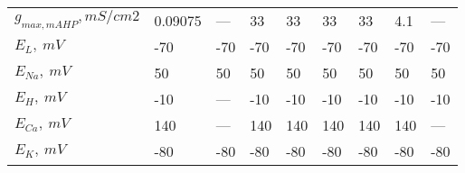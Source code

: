 \begin{longtable}{lllllllll}
$ g_{max, mAHP}, mS/cm2 $ &  0.09075 &    --- &        33 &        33 &        33 &      33 &     4.1 &    --- \\
$E_L, \ mV$ &      -70 &    -70 &       -70 &       -70 &       -70 &     -70 &     -70 &    -70 \\
$ E_{Na},\ mV$ &       50 &     50 &        50 &        50 &        50 &      50 &      50 &     50 \\
$E_H,\ mV$ &      -10 &    --- &       -10 &       -10 &       -10 &     -10 &     -10 &    -10 \\
$E_{Ca},\ mV$ &      140 &    --- &       140 &       140 &       140 &     140 &     140 &    --- \\
$E_K,\ mV$ &      -80 &    -80 &       -80 &       -80 &       -80 &     -80 &     -80 &    -80 \\
\end{longtable}
